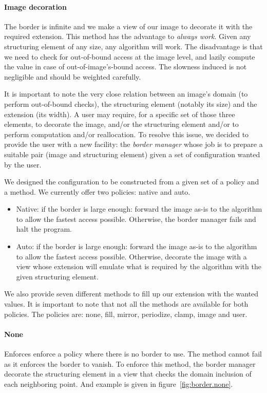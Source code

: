 \paragraph{Image decoration}
The border is infinite and we make a view of our image to decorate it with the required extension. This method has the
advantage to \textit{always work}. Given any structuring element of any size, any algorithm will work. The disadvantage
is that we need to check for out-of-bound access at the image level, and lazily compute the value in case of
out-of-image's-bound access. The slowness induced is not negligible and should be weighted carefully.

\bigskip

It is important to note the very close relation between an image's domain (to perform out-of-bound checks), the
structuring element (notably its size) and the extension (its width). A user may require, for a specific set of those
three elements, to decorate the image, and/or the structuring element and/or to perform computation and/or reallocation.
To resolve this issue, we decided to provide the user with a new facility: the \textit{border manager} whose job is to
prepare a suitable pair (image and structuring element) given a set of configuration wanted by the user.

We designed the configuration to be constructed from a given set of a policy and a method. We currently offer two
policies: native and auto.

\begin{itemize}
  \item Native: if the border is large enough: forward the image as-is to the algorithm to allow the fastest access
        possible. Otherwise, the border manager fails and halt the program.
  \item Auto: if the border is large enough: forward the image as-is to the algorithm to allow the fastest access
        possible. Otherwise, decorate the image with a view whose extension will emulate what is required by the
        algorithm with the given structuring element.
\end{itemize}

We also provide seven different methods to fill up our extension with the wanted values. It is important to note that
not all the methods are available for both policies. The policies are: none, fill, mirror, periodize, clamp, image and
user.

\paragraph{None} Enforces enforce a policy where there is no border to use. The method cannot fail as it enforces the
border to vanish. To enforce this method, the border manager decorate the structuring element in a view that checks the
domain inclusion of each neighboring point. And example is given in figure~\ref{fig:border.none}.

